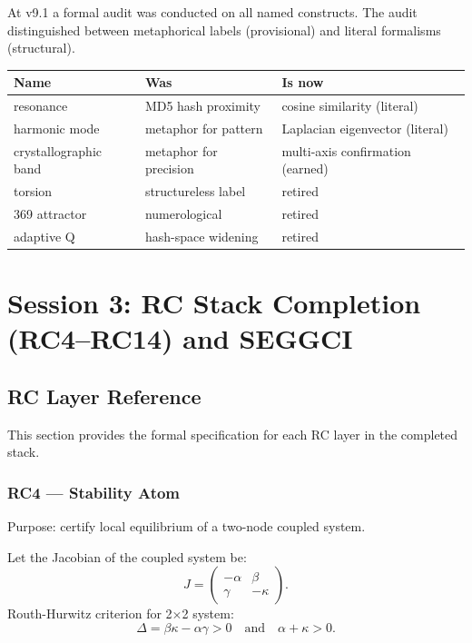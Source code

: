 \documentclass[11pt,twoside]{article}
\begin{document}
At v9.1 a formal audit was conducted on all named constructs. The audit distinguished
between metaphorical labels (provisional) and literal formalisms (structural).

\begin{center}
\begin{tabular}{lll}
\toprule
Name & Was & Is now \\
\midrule
resonance & MD5 hash proximity & cosine similarity (literal) \\
harmonic mode & metaphor for pattern & Laplacian eigenvector (literal) \\
crystallographic band & metaphor for precision & multi-axis confirmation (earned) \\
torsion & structureless label & \textcolor{retired}{retired} \\
369 attractor & numerological & \textcolor{retired}{retired} \\
adaptive Q & hash-space widening & \textcolor{retired}{retired} \\
\bottomrule
\end{tabular}
\end{center}

\section{Session 3: RC Stack Completion (RC4--RC14) and SEGGCI}

\subsection{RC Layer Reference}

This section provides the formal specification for each RC layer in the completed stack.

\subsubsection{RC4 --- Stability Atom}

Purpose: certify local equilibrium of a two-node coupled system.

Let the Jacobian of the coupled system be:
\[
  J = \begin{pmatrix} -\alpha & \beta \\ \gamma & -\kappa \end{pmatrix}.
\]
Routh-Hurwitz criterion for 2$\times$2 system:
\[
  \Delta = \beta\kappa - \alpha\gamma > 0 \quad \text{and} \quad \alpha + \kappa > 0.
\]
\end{document}
